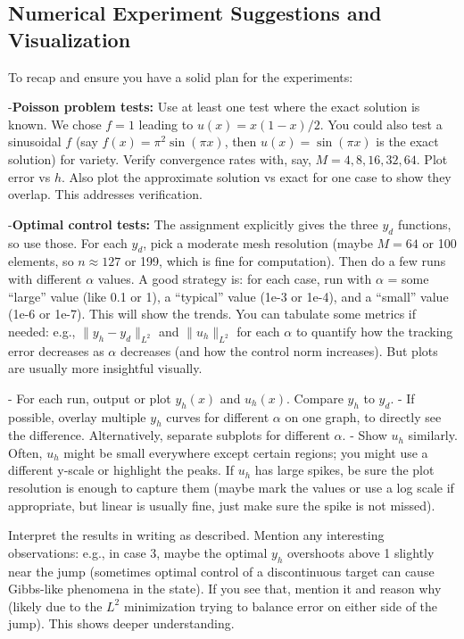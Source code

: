 \documentclass[a4paper,10pt]{article}
\begin{document}
\subsection{Numerical Experiment Suggestions and Visualization}

To recap and ensure you have a solid plan for the experiments:

-\textbf{Poisson problem tests:} Use at least one test where the exact solution is known. We chose \(f=1\) leading to \(u(x)=x(1-x)/2\). You could also test a sinusoidal \(f\) (say \(f(x)=\pi^2 \sin(\pi x)\), then \(u(x)=\sin(\pi x)\) is the exact solution) for variety. Verify convergence rates with, say, \(M=4,8,16,32,64\). Plot error vs \(h\). Also plot the approximate solution vs exact for one case to show they overlap. This addresses verification.

-\textbf{Optimal control tests:} The assignment explicitly gives the three \(y_d\) functions, so use those. For each \(y_d\), pick a moderate mesh resolution (maybe \(M=64\) or 100 elements, so \(n\approx127\) or 199, which is fine for computation). Then do a few runs with different \(\alpha\) values. A good strategy is: for each case, run with \(\alpha\) = some “large” value (like 0.1 or 1), a “typical” value (1e-3 or 1e-4), and a “small” value (1e-6 or 1e-7). This will show the trends. You can tabulate some metrics if needed: e.g., \(\|y_h - y_d\|_{L^2}\) and \(\|u_h\|_{L^2}\) for each \(\alpha\) to quantify how the tracking error decreases as \(\alpha\) decreases (and how the control norm increases). But plots are usually more insightful visually.

- For each run, output or plot \(y_h(x)\) and \(u_h(x)\). Compare \(y_h\) to \(y_d\).
- If possible, overlay multiple \(y_h\) curves for different \(\alpha\) on one graph, to directly see the difference. Alternatively, separate subplots for different \(\alpha\).
- Show \(u_h\) similarly. Often, \(u_h\) might be small everywhere except certain regions; you might use a different y-scale or highlight the peaks. If \(u_h\) has large spikes, be sure the plot resolution is enough to capture them (maybe mark the values or use a log scale if appropriate, but linear is usually fine, just make sure the spike is not missed).

Interpret the results in writing as described. Mention any interesting observations: e.g., in case 3, maybe the optimal \(y_h\) overshoots above 1 slightly near the jump (sometimes optimal control of a discontinuous target can cause Gibbs-like phenomena in the state). If you see that, mention it and reason why (likely due to the \(L^2\) minimization trying to balance error on either side of the jump). This shows deeper understanding.
\end{document}
